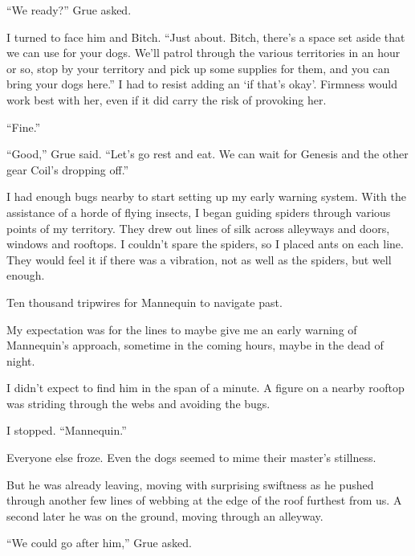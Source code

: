 ``We ready?'' Grue asked.



I turned to face him and Bitch.  ``Just about.  Bitch, there's a space set aside that we can use for your dogs.  We'll patrol through the various territories in an hour or so, stop by your territory and pick up some supplies for them, and you can bring your dogs here.''  I had to resist adding an `if that's okay'.  Firmness would work best with her, even if it did carry the risk of provoking her.



``Fine.''



``Good,'' Grue said.  ``Let's go rest and eat.  We can wait for Genesis and the other gear Coil's dropping off.''



I had enough bugs nearby to start setting up my early warning system.  With the assistance of a horde of flying insects, I began guiding spiders through various points of my territory.  They drew out lines of silk across alleyways and doors, windows and rooftops.  I couldn't spare the spiders, so I placed ants on each line.  They would feel it if there was a vibration, not as well as the spiders, but well enough.



Ten thousand tripwires for Mannequin to navigate past.



My expectation was for the lines to maybe give me an early warning of Mannequin's approach, sometime in the coming hours, maybe in the dead of night.



I didn't expect to find him in the span of a minute.  A figure on a nearby rooftop was striding through the webs and avoiding the bugs.



I stopped.  ``Mannequin.''



Everyone else froze.  Even the dogs seemed to mime their master's stillness.



But he was already leaving, moving with surprising swiftness as he pushed through another few lines of webbing at the edge of the roof furthest from us.  A second later he was on the ground, moving through an alleyway.



``We could go after him,'' Grue asked.



